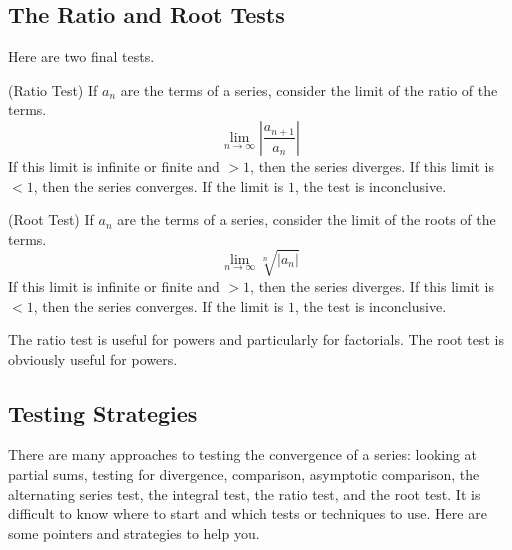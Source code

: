 \documentclass[fleqn]{report}
\begin{document}
\subsection{The Ratio and Root Tests}
\label{ratio-root}

Here are two final tests.

\begin{prop}
(Ratio Test) If $a_n$ are the terms of a series, consider the 
limit of the ratio of the terms.
\begin{equation*}
\lim_{n \rightarrow \infty} \left| \frac{a_{n+1}}{a_n} \right|
\end{equation*}
If this limit is infinite or finite and $>1$, then the
series diverges. If this limit is $<1$, then the series
converges. If the limit is $1$, the test is inconclusive.
\end{prop}

\begin{prop}
(Root Test) If $a_n$ are the terms of a series, consider the 
limit of the roots of the terms. 
\begin{equation*}
\lim_{n \rightarrow \infty} \sqrt[n]{|a_n|} 
\end{equation*}
If this limit is infinite or finite and $>1$, then the
series diverges. If this limit is $<1$, then the series
converges. If the limit is $1$, the test is inconclusive.
\end{prop}

The ratio test is useful for powers and particularly for
factorials. The root test is obviously useful for powers.

\subsection{Testing Strategies}
\label{testing-strategies}

There are many approaches to testing the convergence of a
series: looking at partial sums, testing for divergence,
comparison, asymptotic comparison, the alternating series
test, the integral test, the ratio test, and the root test.
It is difficult to know where to start and which tests
or techniques to use. Here are some pointers and strategies
to help you.
\end{document}
